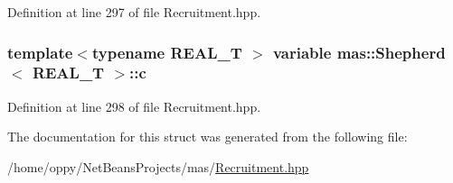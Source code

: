 Definition at line 297 of file Recruitment.\-hpp.

\hypertarget{structmas_1_1_shepherd_ab9a9d636240bb7b6b3cea58a85fc5435}{
\subsubsection[{c}]{\setlength{\rightskip}{0pt plus 5cm}template$<$typename R\-E\-A\-L\-\_\-\-T $>$ {\bf variable} {\bf mas\-::\-Shepherd}$<$ R\-E\-A\-L\-\_\-\-T $>$\-::c}}\label{structmas_1_1_shepherd_ab9a9d636240bb7b6b3cea58a85fc5435}


Definition at line 298 of file Recruitment.\-hpp.



The documentation for this struct was generated from the following file\-:\begin{DoxyCompactItemize}
\item 
/home/oppy/\-Net\-Beans\-Projects/mas/\hyperlink{_recruitment_8hpp}{Recruitment.\-hpp}\end{DoxyCompactItemize}
